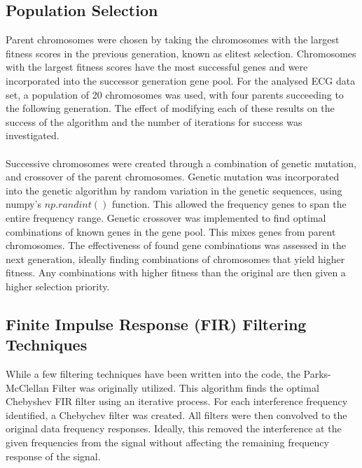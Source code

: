 \documentclass[a4paper, 11pt]{article}
\begin{document}
    \subsection{Population Selection}\label{sec:meth_sub3}
        Parent chromosomes were chosen by taking the chromosomes with the largest fitness scores in the previous generation,
        known as elitest selection. 
        Chromosomes with the largest fitness scores have the most successful genes and were incorporated into the
        successor generation gene pool. For the analysed ECG data set, a population of 20 chromosomes was used, with four
        parents succeeding to the following generation. The effect of modifying each of these results on the success of the
        algorithm and the number of iterations for success was investigated. 
        \\\\
        Successive chromosomes were created through a combination of genetic mutation, and crossover of the parent chromosomes.
        Genetic mutation was incorporated into the genetic algorithm by random variation in the genetic sequences, using numpy's 
        $np.randint()$ function. This allowed the frequency genes to span the entire frequency range. Genetic crossover was implemented
        to find optimal combinations of known genes in the gene pool. This mixes genes from parent chromosomes. The effectiveness of 
        found gene combinations was assessed in the next generation, ideally finding combinations of chromosomes that yield higher 
        fitness. Any combinations with higher fitness than the original are then given a higher selection priority. 

    \subsection{Finite Impulse Response (FIR) Filtering Techniques}\label{sec:meth_sub4}
        While a few filtering techniques have been written into the code, the Parks-McClellan Filter was originally utilized. 
        This algorithm finds the optimal Chebyshev FIR filter using an iterative process. For each interference frequency identified, 
        a Chebychev filter was created. All filters were then convolved to the original data frequency responses. Ideally, this 
        removed the interference at the given frequencies from the signal without affecting the remaining frequency response of the signal.
\end{document}
